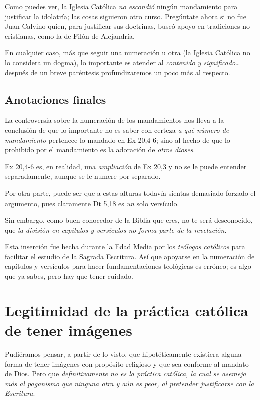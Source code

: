 \documentclass{article}
\begin{document}
\noindent
Como puedes ver, la Iglesia Cat\'olica \emph{no escondi\'o} ning\'un mandamiento para justificar la idolatr\'{i}a; las cosas siguieron otro curso. Preg\'untate ahora si no fue Juan Calvino quien, para justificar sus doctrinas, busc\'o apoyo en tradiciones no cristianas, como la de Fil\'on de Alejandr\'{i}a.

En cualquier caso, m\'as que seguir una numeraci\'on u otra (la Iglesia Cat\'olica no lo considera un dogma), lo importante es atender al \emph{contenido y significado}\ldots despu\'es de un breve par\'entesis profundizaremos un poco m\'as al respecto.

\subsection{Anotaciones finales}
La controversia sobre la numeraci\'on de los mandamientos nos lleva a la conclusi\'on de que lo importante no es saber con certeza \emph{a qu\'e n\'umero de mandamiento} pertenece lo mandado en Ex 20,4-6; sino al hecho de que lo prohibido por el mandamiento es la adoraci\'on de \emph{otros dioses}.

Ex 20,4-6 es, en realidad, una \emph{ampliaci\'on} de Ex 20,3 y no se le puede entender separadamente, aunque se le numere por separado.

Por otra parte, puede ser que a estas alturas todav\'{i}a sientas demasiado forzado el argumento, pues claramente Dt 5,18 es \emph{un} solo vers\'{i}culo.

Sin embargo, como buen conocedor de la Biblia que eres, no te ser\'a desconocido, que \emph{la divisi\'on en cap\'{i}tulos y vers\'{i}culos no forma parte de la revelaci\'on}.

Esta inserci\'on fue hecha durante la Edad Media por los \emph{te\'ologos cat\'olicos} para facilitar el estudio de la Sagrada Escritura. As\'{i} que apoyarse en la numeraci\'on de cap\'{i}tulos y vers\'{i}culos para hacer fundamentaciones teol\'ogicas es err\'oneo; es algo que ya sabes, pero hay que tener cuidado.

\section{Legitimidad de la pr\'actica cat\'olica de tener im\'agenes}

Pudi\'eramos pensar, a partir de lo visto, que hipot\'eticamente existiera alguna forma de tener im\'agenes con prop\'osito religioso y que sea conforme al mandato de Dios. Pero que \emph{definitivamente no es la pr\'actica cat\'olica, la cual se asemeja m\'as al paganismo que ninguna otra y a\'un es peor, al pretender justificarse con la Escritura}.
\end{document}

